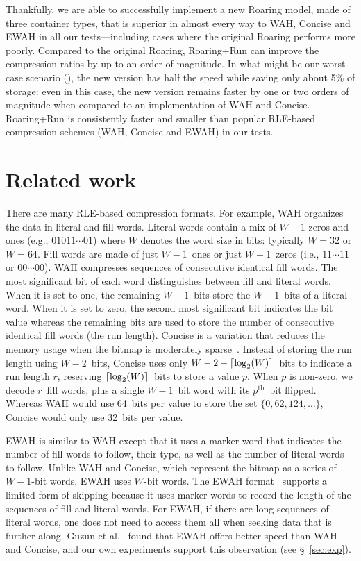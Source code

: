 \documentclass[times]{speauth}
\DeclarePairedDelimiter\ceil{\lceil}{\rceil}
\begin{document}
Thankfully, we are able to successfully implement
a new Roaring model, made of three container types, that is superior in almost every way to WAH, Concise and EWAH in all our tests---including cases where the original Roaring performs more poorly. Compared to the original Roaring, Roaring+Run can improve the compression ratios by up to an order of magnitude. In what might be our worst-case scenario (\Censeighten{}), the new version has half the speed while saving only about 5\% of storage: even in this case, the new version remains faster by one or two orders of magnitude
when
compared to an implementation of WAH and Concise. Roaring+Run is consistently faster and smaller than popular RLE-based compression schemes (WAH,  Concise and EWAH) in our tests.


\section{Related work}\label{sec:relwork}


There are many RLE-based compression formats. For example, WAH organizes the data in
literal and fill words.
Literal words contain a mix of $W-1$ zeros and ones (e.g., $01011\cdots01$)
where $W$ denotes the word size in bits: typically $W=32$ or $W=64$.
Fill words are made of just $W-1$~ones or just $W-1$~zeros (i.e.,
$11\cdots11$
or  $00\cdots00$).
WAH compresses sequences of consecutive identical  fill words.
The most significant bit of each word distinguishes between
fill and literal words. When it is set to one, the remaining $W-1$~bits store the $W-1$~bits of a literal word. When it is set to zero, the second most significant bit indicates the bit value whereas the remaining bits are used to store the number of consecutive identical fill words (the run length).
Concise is a variation that reduces the memory usage when the bitmap is
moderately
 sparse~\cite{colantonio:2010:ccn:1824821.1824857}. Instead of storing the run length
 using $W-2$~bits, Concise uses only $W-2- \ceil*{\log_2 (W)}$~bits to indicate a run length $r$, reserving $\ceil*{\log_2 (W)}$~bits to store a  value $p$.
 When $p$ is non-zero, we decode $r$~fill words, plus a single $W-1$~bit word with its $p^{\mathrm{th}}$~bit flipped.
 Whereas WAH would use 64~bits per value to store the set $\{0,62, 124,\ldots\}$, Concise would only use 32~bits per value.


 EWAH is similar to WAH except that
 it uses a marker word that indicates the number of fill words to follow, their type, as well as the number of literal words to follow.
 Unlike WAH and Concise, which represent the bitmap as a series of $W-1$-bit words, EWAH uses $W$-bit words.
 The EWAH format~\cite{arxiv:0901.3751} supports a limited form of skipping because
it uses marker words  to record the length of the sequences of
fill and literal words.
For EWAH,
if there are long sequences of
literal words, one does not need to access them all
when
seeking data that is further along.  Guzun et
al.~\cite{guzuntunable,Guzun2015} found that EWAH offers better speed than WAH and Concise, and our own experiments support this observation (see \S~\ref{sec:exp}). 
\end{document}
